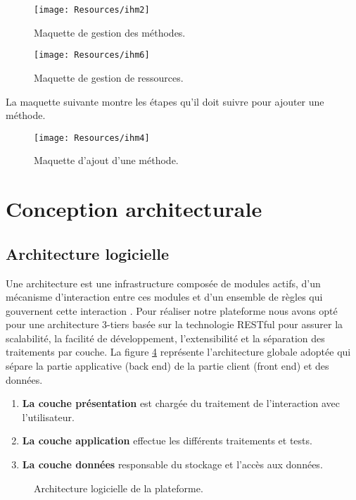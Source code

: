 \begin{figure}[H]
	\centering
	\texttt{[image: Resources/ihm2]}
	\caption{Maquette de gestion des méthodes. }
	\label{ihm1}
\end{figure}
\begin{figure}[H]
	\centering
	\texttt{[image: Resources/ihm6]}
	\caption{Maquette de gestion de ressources. }
	\label{ihm6}
\end{figure}
La maquette suivante montre les étapes qu'il doit suivre pour ajouter une méthode.
\begin{figure}[H]
	\centering
	\texttt{[image: Resources/ihm4]}
	\caption{Maquette d'ajout d'une méthode. }
	\label{ihm2}
\end{figure}


\section{Conception architecturale}
\subsection{Architecture logicielle } 
Une architecture est une infrastructure composée de modules actifs,
d’un mécanisme d’interaction entre ces modules et d’un ensemble de
règles qui gouvernent cette interaction \cite{boasson1995artistry}.
Pour réaliser notre plateforme nous avons opté pour une architecture 3-tiers basée sur la technologie RESTful pour assurer la scalabilité, la facilité de développement, l'extensibilité et la séparation des traitements par couche. La figure \ref{globalarchi} représente l’architecture globale adoptée qui sépare la partie applicative (back end) de la partie client (front end) et des données.
\begin{enumerate}
	\item \textbf{La couche présentation} est chargée du traitement de l'interaction avec l'utilisateur. 
	
	\item \textbf{La couche application} effectue les différents traitements et tests.
	\item \textbf{La couche données} responsable du stockage et l’accès aux données.
	
\end{enumerate}
\begin{figure}[H]
	\centering
	\caption{Architecture logicielle de la plateforme.}
	\label{globalarchi}
\end{figure}





